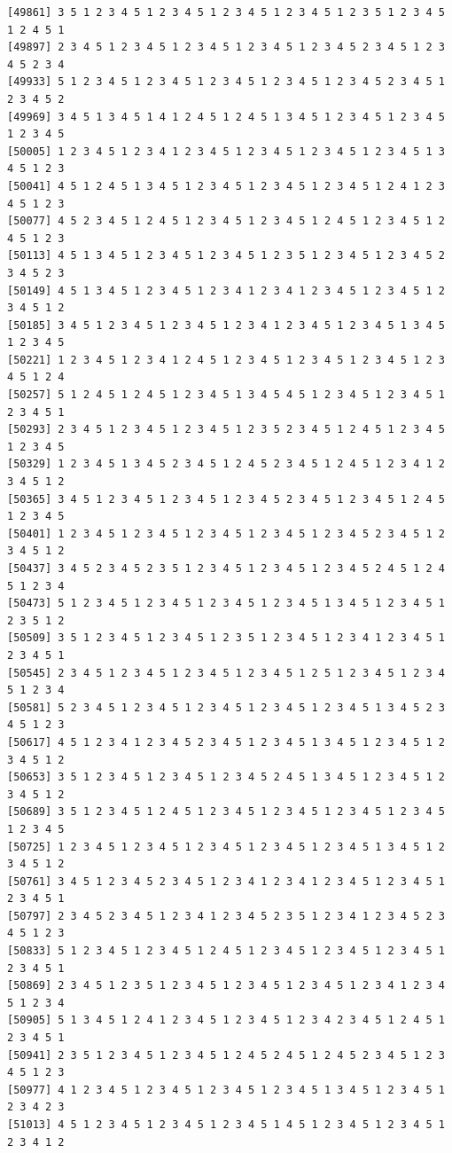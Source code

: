 \documentclass[
  11pt,
]{book}
\begin{document}
\begin{verbatim}
[49861] 3 5 1 2 3 4 5 1 2 3 4 5 1 2 3 4 5 1 2 3 4 5 1 2 3 5 1 2 3 4 5 1 2 4 5 1
[49897] 2 3 4 5 1 2 3 4 5 1 2 3 4 5 1 2 3 4 5 1 2 3 4 5 2 3 4 5 1 2 3 4 5 2 3 4
[49933] 5 1 2 3 4 5 1 2 3 4 5 1 2 3 4 5 1 2 3 4 5 1 2 3 4 5 2 3 4 5 1 2 3 4 5 2
[49969] 3 4 5 1 3 4 5 1 4 1 2 4 5 1 2 4 5 1 3 4 5 1 2 3 4 5 1 2 3 4 5 1 2 3 4 5
[50005] 1 2 3 4 5 1 2 3 4 1 2 3 4 5 1 2 3 4 5 1 2 3 4 5 1 2 3 4 5 1 3 4 5 1 2 3
[50041] 4 5 1 2 4 5 1 3 4 5 1 2 3 4 5 1 2 3 4 5 1 2 3 4 5 1 2 4 1 2 3 4 5 1 2 3
[50077] 4 5 2 3 4 5 1 2 4 5 1 2 3 4 5 1 2 3 4 5 1 2 4 5 1 2 3 4 5 1 2 4 5 1 2 3
[50113] 4 5 1 3 4 5 1 2 3 4 5 1 2 3 4 5 1 2 3 5 1 2 3 4 5 1 2 3 4 5 2 3 4 5 2 3
[50149] 4 5 1 3 4 5 1 2 3 4 5 1 2 3 4 1 2 3 4 1 2 3 4 5 1 2 3 4 5 1 2 3 4 5 1 2
[50185] 3 4 5 1 2 3 4 5 1 2 3 4 5 1 2 3 4 1 2 3 4 5 1 2 3 4 5 1 3 4 5 1 2 3 4 5
[50221] 1 2 3 4 5 1 2 3 4 1 2 4 5 1 2 3 4 5 1 2 3 4 5 1 2 3 4 5 1 2 3 4 5 1 2 4
[50257] 5 1 2 4 5 1 2 4 5 1 2 3 4 5 1 3 4 5 4 5 1 2 3 4 5 1 2 3 4 5 1 2 3 4 5 1
[50293] 2 3 4 5 1 2 3 4 5 1 2 3 4 5 1 2 3 5 2 3 4 5 1 2 4 5 1 2 3 4 5 1 2 3 4 5
[50329] 1 2 3 4 5 1 3 4 5 2 3 4 5 1 2 4 5 2 3 4 5 1 2 4 5 1 2 3 4 1 2 3 4 5 1 2
[50365] 3 4 5 1 2 3 4 5 1 2 3 4 5 1 2 3 4 5 2 3 4 5 1 2 3 4 5 1 2 4 5 1 2 3 4 5
[50401] 1 2 3 4 5 1 2 3 4 5 1 2 3 4 5 1 2 3 4 5 1 2 3 4 5 2 3 4 5 1 2 3 4 5 1 2
[50437] 3 4 5 2 3 4 5 2 3 5 1 2 3 4 5 1 2 3 4 5 1 2 3 4 5 2 4 5 1 2 4 5 1 2 3 4
[50473] 5 1 2 3 4 5 1 2 3 4 5 1 2 3 4 5 1 2 3 4 5 1 3 4 5 1 2 3 4 5 1 2 3 5 1 2
[50509] 3 5 1 2 3 4 5 1 2 3 4 5 1 2 3 5 1 2 3 4 5 1 2 3 4 1 2 3 4 5 1 2 3 4 5 1
[50545] 2 3 4 5 1 2 3 4 5 1 2 3 4 5 1 2 3 4 5 1 2 5 1 2 3 4 5 1 2 3 4 5 1 2 3 4
[50581] 5 2 3 4 5 1 2 3 4 5 1 2 3 4 5 1 2 3 4 5 1 2 3 4 5 1 3 4 5 2 3 4 5 1 2 3
[50617] 4 5 1 2 3 4 1 2 3 4 5 2 3 4 5 1 2 3 4 5 1 3 4 5 1 2 3 4 5 1 2 3 4 5 1 2
[50653] 3 5 1 2 3 4 5 1 2 3 4 5 1 2 3 4 5 2 4 5 1 3 4 5 1 2 3 4 5 1 2 3 4 5 1 2
[50689] 3 5 1 2 3 4 5 1 2 4 5 1 2 3 4 5 1 2 3 4 5 1 2 3 4 5 1 2 3 4 5 1 2 3 4 5
[50725] 1 2 3 4 5 1 2 3 4 5 1 2 3 4 5 1 2 3 4 5 1 2 3 4 5 1 3 4 5 1 2 3 4 5 1 2
[50761] 3 4 5 1 2 3 4 5 2 3 4 5 1 2 3 4 1 2 3 4 1 2 3 4 5 1 2 3 4 5 1 2 3 4 5 1
[50797] 2 3 4 5 2 3 4 5 1 2 3 4 1 2 3 4 5 2 3 5 1 2 3 4 1 2 3 4 5 2 3 4 5 1 2 3
[50833] 5 1 2 3 4 5 1 2 3 4 5 1 2 4 5 1 2 3 4 5 1 2 3 4 5 1 2 3 4 5 1 2 3 4 5 1
[50869] 2 3 4 5 1 2 3 5 1 2 3 4 5 1 2 3 4 5 1 2 3 4 5 1 2 3 4 1 2 3 4 5 1 2 3 4
[50905] 5 1 3 4 5 1 2 4 1 2 3 4 5 1 2 3 4 5 1 2 3 4 2 3 4 5 1 2 4 5 1 2 3 4 5 1
[50941] 2 3 5 1 2 3 4 5 1 2 3 4 5 1 2 4 5 2 4 5 1 2 4 5 2 3 4 5 1 2 3 4 5 1 2 3
[50977] 4 1 2 3 4 5 1 2 3 4 5 1 2 3 4 5 1 2 3 4 5 1 3 4 5 1 2 3 4 5 1 2 3 4 2 3
[51013] 4 5 1 2 3 4 5 1 2 3 4 5 1 2 3 4 5 1 4 5 1 2 3 4 5 1 2 3 4 5 1 2 3 4 1 2

\end{verbatim}
\end{document}
